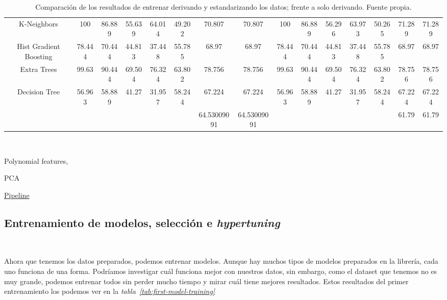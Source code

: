 \begin{table}
{\begin{tabular}{|c|ccccccc|ccccccc|}
        K-Neighbors & 100 & 86.889 & 55.639 & 64.014 & 49.202 & 70.807 & 70.807 & 100 & 86.889 & 56.296 & 63.973 & 50.265 & 71.289 & 71.289 \\
        Hist Gradient Boosting & 78.444 & 70.444 & 44.813 & 37.448 & 55.785 & 68.97 & 68.97 & 78.444 & 70.444 & 44.813 & 37.448 & 55.785 & 68.97 & 68.97 \\
        Extra Trees & 99.63 & 90.444 & 69.504 & 76.324 & 63.802 & 78.756 & 78.756 & 99.63 & 90.444 & 69.504 & 76.324 & 63.802 & 78.756 & 78.756 \\
        Decision Tree & 56.963 & 58.889 & 41.27 & 31.957 & 58.244 & 67.224 & 67.224 & 56.963 & 58.889 & 41.27 & 31.957 & 58.244 & 67.224 & 67.224 \\ \hline
        & & & & & & 64.53009091 & 64.53009091 & & & & & & 61.79 & 61.79 \\ \hline
        \end{tabular}}
    \caption{Comparación de los resultados de entrenar derivando y estandarizando los datos; frente a solo derivando. Fuente propia.}\ \label{tab:derivative-standarization-results}
\end{table}


Polynomial features,

PCA




\href{https://scikit-learn.org/stable/modules/generated/sklearn.pipeline.Pipeline.html}{Pipeline}


\subsection{Entrenamiento de modelos, selección e \textit{hypertuning}}\ \label{sec:entrenamiento}

Ahora que tenemos los datos preparados, podemos entrenar modelos. Aunque hay muchos tipos de modelos preparados en la librería, cada uno funciona de una forma. Podríamos investigar cuál funciona mejor con nuestros datos, sin embargo, como el \gls{dataset} que tenemos no es muy grande, podemos entrenar todos sin perder mucho tiempo y mirar cuál tiene mejores resultados. Estos resultados del primer entrenamiento los podemos ver en la \textit{tabla\ \ref{tab:first-model-training}}

